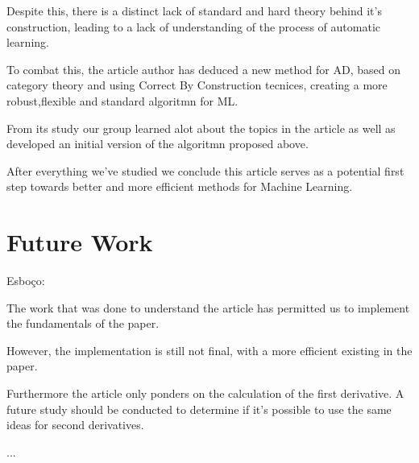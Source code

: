\documentclass[11pt,a4]{article}
\theoremstyle{definition}
\theoremstyle{Definition}
\theoremstyle{Definition}
\begin{document}
	Despite this, there is a distinct lack of standard and hard theory behind it's construction, leading to a lack of understanding of the process of automatic learning.

	To combat this, the article author has deduced a new method for AD, based on category theory and using Correct By Construction tecnices, creating a more robust,flexible and standard algoritmn for ML.

	From its study our group learned alot about the topics in the article as well as developed an initial version of the algoritmn proposed above.

	After everything we've studied we conclude this article serves as a potential first step towards better and more efficient methods for Machine Learning.



	\section{Future Work}

	Esboço:

	The work that was done to understand the article has permitted us to implement the fundamentals of the paper.

	However, the implementation is still not final, with a more efficient existing in the paper.

	Furthermore the article only ponders on the calculation of the first derivative.
	A future study should be conducted to determine if it's possible to use the same ideas for second derivatives.

	...
	
	
	\newpage



    
\end{document}
